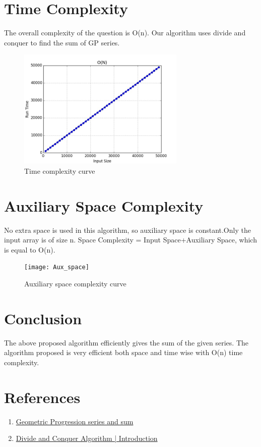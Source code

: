 \documentclass[conference]{IEEEtran}
\begin{document}
\section{\textbf {Time Complexity}}
\noindent The overall complexity of the question is O(n).
Our algorithm uses divide and conquer to find the sum of GP series.
\begin{figure}[htp]
    \centering
    \includegraphics[width=8cm]{TimeComplexity}
    \caption{Time complexity curve}
    \label{fig:TimeComplexity.jpeg}
\end{figure}

\section{\textbf {Auxiliary Space Complexity}}
\noindent No extra space is used in this algorithm, so auxiliary space is constant.Only the input array is of size n.
Space Complexity = Input Space+Auxiliary Space, which is equal to O(n).


\begin{figure}[htp]
    \centering
    \texttt{[image: Aux\_space]}
    \caption{Auxiliary space complexity curve}
    \label{fig:Aux_space.jpeg}
\end{figure}

\section{\textbf {Conclusion}} \noindent The above proposed algorithm efficiently gives the sum of the given series. The algorithm proposed is very efficient both space and time wise with  O(n) time complexity.\\
\section{\textbf {References}} 
\begin{enumerate}

\item  \href{https://mathematics.laerd.com/maths/geometric-progression-intro.php}{Geometric Progression series and sum}\\
    
\item  \href{https://www.geeksforgeeks.org/divide-and-conquer-algorithm-introduction/}{
Divide and Conquer Algorithm | Introduction}
\\

\end{enumerate}
\end{document}
